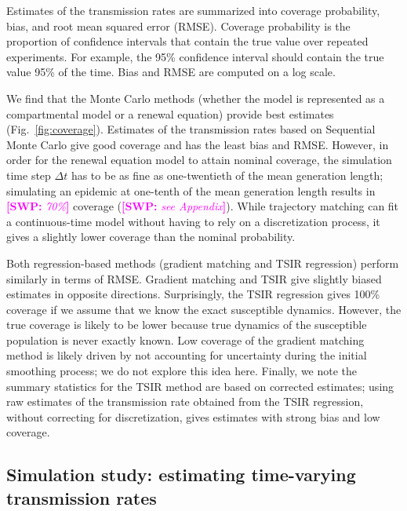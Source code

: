 \documentclass{article}
\newcommand{\fref}[1]{Fig.~\ref{fig:#1}}
\newcommand{\comment}[3]{\textcolor{#1}{\textbf{[#2: }\textsl{#3}\textbf{]}}}
\newcommand{\swp}[1]{\comment{magenta}{SWP}{#1}}
\begin{document}
Estimates of the transmission rates are summarized into coverage probability, bias, and root mean squared error (RMSE).
Coverage probability is the proportion of confidence intervals that contain the true value over repeated experiments. 
For example, the 95\% confidence interval should contain the true value 95\% of the time.
Bias and RMSE are computed on a log scale.

We find that the Monte Carlo methods (whether the model is represented as a compartmental model or a renewal equation) provide best estimates (\fref{coverage}).
Estimates of the transmission rates based on Sequential Monte Carlo give good coverage and has the least bias and RMSE.
However, in order for the renewal equation model to attain nominal coverage, the simulation time step $\Delta t$ has to be as fine as one-twentieth of the mean generation length; 
simulating an epidemic at one-tenth of the mean generation length results in \swp{70\%} coverage (\swp{see Appendix}).
While trajectory matching can fit a continuous-time model without having to rely on a discretization process, it gives a slightly lower coverage than the nominal probability.

Both regression-based methods (gradient matching and TSIR regression) perform similarly in terms of RMSE.
Gradient matching and TSIR give slightly biased estimates in opposite directions.
Surprisingly, the TSIR regression gives 100\% coverage if we assume that we know the exact susceptible dynamics.
However, the true coverage is likely to be lower because true dynamics of the susceptible population is never exactly known.
Low coverage of the gradient matching method is likely driven by not accounting for uncertainty during the initial smoothing process; we do not explore this idea here.
Finally, we note the summary statistics for the TSIR method are based on corrected estimates; using raw estimates of the transmission rate obtained from the TSIR regression, without correcting for discretization, gives estimates with strong bias and low coverage.

\subsection{Simulation study: estimating time-varying transmission rates}
\end{document}

